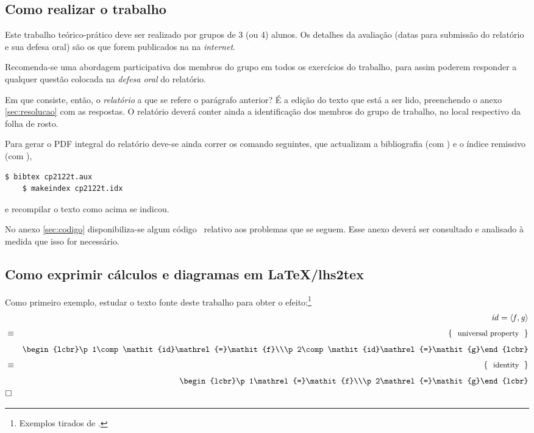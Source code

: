 \documentclass[a4paper]{article}
\newcommand{\Varid}[1]{\mathit{#1}}
\begin{document}
\subsection{Como realizar o trabalho}
Este trabalho teórico-prático deve ser realizado por grupos de 3 (ou 4) alunos.
Os detalhes da avaliação (datas para submissão do relatório e sua defesa
oral) são os que forem publicados na  na \emph{internet}.

Recomenda-se uma abordagem participativa dos membros do grupo em todos os
exercícios do trabalho, para assim poderem responder a qualquer questão colocada
na \emph{defesa oral} do relatório.

Em que consiste, então, o \emph{relatório} a que se refere o parágrafo anterior?
É a edição do texto que está a ser lido, preenchendo o anexo \ref{sec:resolucao}
com as respostas. O relatório deverá conter ainda a identificação dos membros
do grupo de trabalho, no local respectivo da folha de rosto.

Para gerar o PDF integral do relatório deve-se ainda correr os comando seguintes,
que actualizam a bibliografia (com \Bibtex) e o índice remissivo (com \Makeindex),
\begin{Verbatim}[fontsize=\small]
    $ bibtex cp2122t.aux
    $ makeindex cp2122t.idx
\end{Verbatim}
e recompilar o texto como acima se indicou.

No anexo \ref{sec:codigo} disponibiliza-se algum código \Haskell\ relativo
aos problemas que se seguem. Esse anexo deverá ser consultado e analisado
à medida que isso for necessário.

\subsection{Como exprimir cálculos e diagramas em LaTeX/lhs2tex}
Como primeiro exemplo, estudar o texto fonte deste trabalho para obter o
efeito:\footnote{Exemplos tirados de \cite{Ol18}.}
\begin{eqnarray*}
\start
     \ensuremath{\Varid{id}\mathrel{=}\conj{\Varid{f}}{\Varid{g}}}
%
\just\equiv{ universal property }
%
        \ensuremath{\begin{lcbr}\p1\comp \Varid{id}\mathrel{=}\Varid{f}\\\p2\comp \Varid{id}\mathrel{=}\Varid{g}\end{lcbr}}
%
\just\equiv{ identity }
%
        \ensuremath{\begin{lcbr}\p1\mathrel{=}\Varid{f}\\\p2\mathrel{=}\Varid{g}\end{lcbr}}
%
\qed
\end{eqnarray*}
\end{document}
